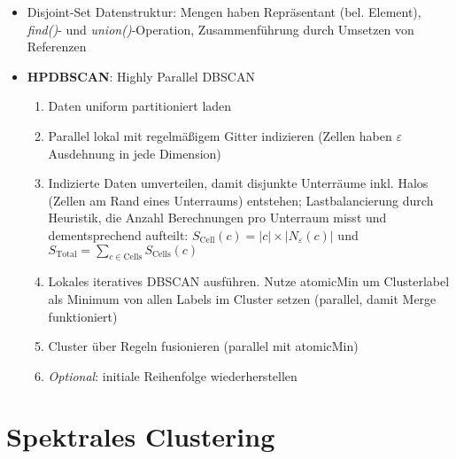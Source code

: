 \documentclass[11pt]{scrartcl}
\begin{document}
\begin{itemize}
    \item Disjoint-Set Datenstruktur: Mengen haben Repräsentant (bel. Element), \textit{find()}-
    und \textit{union()}-Operation, Zusammenführung durch Umsetzen von Referenzen
    \item \textbf{HPDBSCAN}: Highly Parallel DBSCAN
    \begin{enumerate}
        \item Daten uniform partitioniert laden
        \item Parallel lokal mit regelmäßigem Gitter indizieren (Zellen haben $\varepsilon$ 
        Ausdehnung in jede Dimension)
        \item Indizierte Daten umverteilen, damit disjunkte Unterräume inkl. Halos 
        (Zellen am Rand eines Unterraums) entstehen; Lastbalancierung durch Heuristik, die Anzahl
        Berechnungen pro Unterraum misst und dementsprechend aufteilt: $S_\mathrm{Cell}(c) = |c| 
        \times |N_\varepsilon(c)|$ und $S_\mathrm{Total} = \sum_{c \in \mathrm{Cells}} 
        S_\mathrm{Cells}(c)$
        \item Lokales iteratives DBSCAN ausführen. Nutze atomicMin um Clusterlabel als Minimum
        von allen Labels im Cluster setzen (parallel, damit Merge funktioniert)
        \item Cluster über Regeln fusionieren (parallel mit atomicMin)
        \item \textit{Optional}: initiale Reihenfolge wiederherstellen
    \end{enumerate}
\end{itemize}

\section{Spektrales Clustering}
\end{document}

